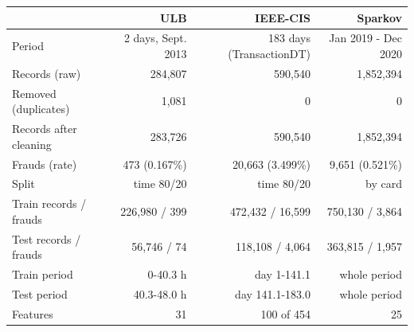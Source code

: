 \begin{tabular}{lrrr}
\hline
 & ULB & IEEE-CIS & Sparkov \\
\hline
Period & 2 days{,} Sept. 2013 & 183 days (TransactionDT) & Jan 2019 - Dec 2020 \\
Records (raw) & 284{,}807 & 590{,}540 & 1{,}852{,}394 \\
Removed (duplicates) & 1{,}081 & 0 & 0 \\
Records after cleaning & 283{,}726 & 590{,}540 & 1{,}852{,}394 \\
Frauds (rate) & 473 (0.167\%) & 20{,}663 (3.499\%) & 9{,}651 (0.521\%) \\
Split & time 80/20 & time 80/20 & by card \\
Train records / frauds & 226{,}980 / 399 & 472{,}432 / 16{,}599 & 750{,}130 / 3{,}864 \\
Test records / frauds & 56{,}746 / 74 & 118{,}108 / 4{,}064 & 363{,}815 / 1{,}957 \\
Train period & 0-40.3 h & day 1-141.1 & whole period \\
Test period & 40.3-48.0 h & day 141.1-183.0 & whole period \\
Features & 31 & 100 of 454 & 25 \\
\hline
\end{tabular}
